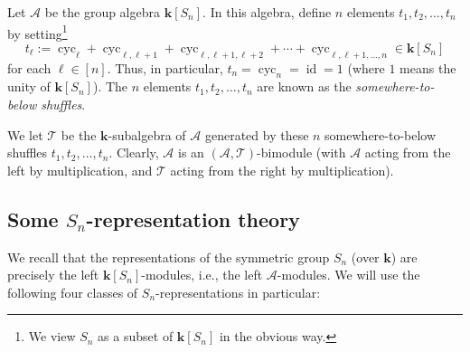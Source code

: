 \documentclass[numbers=enddot,12pt,final,onecolumn,notitlepage]{scrartcl}%
\theoremstyle{definition}
\begin{document}
Let $\mathcal{A}$ be the group algebra $\mathbf{k}\left[  S_{n}\right]  $. In
this algebra, define $n$ elements $t_{1},t_{2},\ldots,t_{n}$ by
setting\footnote{We view $S_{n}$ as a subset of $\mathbf{k}\left[
S_{n}\right]  $ in the obvious way.}%
\[
t_{\ell}:=\operatorname*{cyc}\nolimits_{\ell}+\operatorname*{cyc}%
\nolimits_{\ell,\ell+1}+\operatorname*{cyc}\nolimits_{\ell,\ell+1,\ell
+2}+\cdots+\operatorname*{cyc}\nolimits_{\ell,\ell+1,\ldots,n}\in
\mathbf{k}\left[  S_{n}\right]
\]
for each $\ell\in\left[  n\right]  $. Thus, in particular, $t_{n}%
=\operatorname*{cyc}\nolimits_{n}=\operatorname*{id}=1$ (where $1$ means the
unity of $\mathbf{k}\left[  S_{n}\right]  $). The $n$ elements $t_{1}%
,t_{2},\ldots,t_{n}$ are known as the \emph{somewhere-to-below shuffles}.

We let $\mathcal{T}$ be the $\mathbf{k}$-subalgebra of $\mathcal{A}$ generated
by these $n$ somewhere-to-below shuffles $t_{1},t_{2},\ldots,t_{n}$. Clearly,
$\mathcal{A}$ is an $\left(  \mathcal{A},\mathcal{T}\right)  $-bimodule (with
$\mathcal{A}$ acting from the left by multiplication, and $\mathcal{T}$ acting
from the right by multiplication).

\subsection{Some $S_{n}$-representation theory}

We recall that the representations of the symmetric group $S_{n}$ (over
$\mathbf{k}$) are precisely the left $\mathbf{k}\left[  S_{n}\right]
$-modules, i.e., the left $\mathcal{A}$-modules. We will use the following
four classes of $S_{n}$-representations in particular:
\end{document}

